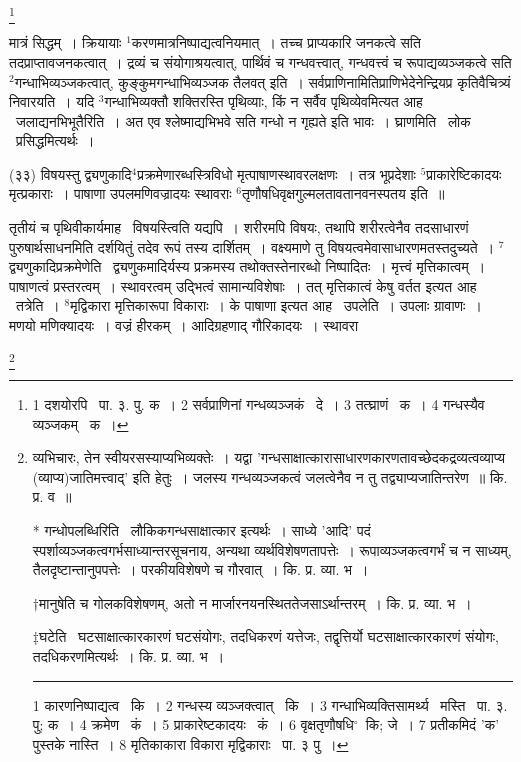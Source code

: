 \documentclass[11pt, openany]{book}
\newcommand\blfootnote[1]{%
 \begingroup
 \renewcommand\thefootnote{}\footnote{#1}%
 \addtocounter{footnote}{-1}%
 \endgroup
}
\begin{document}
\blfootnote{1 दशयोरपि  \textendash\ पा. ३. पु. क~। 2 सर्वप्राणिनां गन्धव्यञ्जकं  \textendash\ दे~। 3 तत्घ्राणं  \textendash\ क~। 4 गन्धस्यैव व्यञ्जकम्  \textendash\ क~।}

\newpage
\noindent
मात्रं सिद्धम्~। क्रियायाः ${}^1$करणमात्रनिष्पाद्यत्वनियमात्~। तच्च प्राप्यकारि जनकत्वे सति तदप्राप्तावजनकत्वात्~। द्रव्यं च संयोगाश्रयत्वात्, पार्थिवं च गन्धवत्त्वात्, गन्धवत्त्वं च रूपाद्यव्यञ्जकत्वे सति ${}^2$गन्धाभिव्यञ्जकत्वात्, कुङ्कुमगन्धाभिव्यञ्जक तैलवत् इति~। {\knu सर्वप्राणिना}मितिप्राणिभेदेनेन्द्रियप्र कृतिवैचित्र्यं निवारयति~। यदि ${}^3$गन्धाभिव्यक्तौ शक्तिरस्ति पृथिव्याः, किं न सर्वैव पृथिव्येवमित्यत आह \textendash\ {\knu जलाद्यनभिभूतैरिति}~। अत एव श्लेष्माद्यभिभवे सति गन्धो न गृह्यते इति भावः~। {\knu घ्राणमि}ति \textendash\ लोक \textendash\ प्रसिद्धमित्यर्थः~। 

\begin{sloppypar}
\hangindent=2cm {\knu (३३) विषयस्तु द्व्यणुकादि$^4$प्रक्रमेणारब्धस्त्रिविधो मृत्पाषाणस्थावरलक्षणः~। तत्र भूप्रदेशाः ${}^5$प्राकारेष्टिकादयः मृत्प्रकाराः~। पाषाणा उपलमणिवज्रादयः स्थावराः ${}^6$तृणौषधिवृक्षगुल्मलतावतानवनस्पतय इति~॥}
\end{sloppypar}

तृतीयं च पृथिवीकार्यमाह \textendash\ {\knu विषयस्त्वि}ति यद्यपि~। शरीरमपि विषयः, तथापि शरीरत्वेनैव तदसाधारणं पुरुषार्थसाधनमिति दर्शयितुं तदेव रूपं तस्य दार्शितम्~। वक्ष्यमाणे तु विषयत्वमेवासाधारणमतस्तदुच्यते~। ${}^7${\knu द्व्यणुकादिप्रक्रमेणेति} \textendash\ द्व्यणुकमादिर्यस्य प्रक्रमस्य तथोक्तस्तेनारब्धो निष्पादितः~। मृत्त्वं मृत्तिकात्वम्~। पाषाणत्वं प्रस्तरत्वम्~। स्थावरत्वम् उद्भित्वं सामान्यविशेषाः~। तत् मृत्तिकात्वं केषु वर्तत इत्यत आह \textendash\ {\knu तत्रे}ति~। ${}^8$मृद्विकारा मृत्तिकारूपा विकाराः~। के पाषाणा इत्यत आह \textendash\ {\knu उपले}ति~। उपलाः ग्रावाणः~। मणयो मणिक्यादयः~। वज्रं हीरकम्~। आदिग्रहणाद् गौरिकादयः~। {\knu स्थावरा}

\blfootnote{व्यभिचारः, तेन स्वीयरसस्याप्यभिव्यक्तेः~। यद्वा 'गन्धसाक्षात्कारासाधारणकारणतावच्छेदकद्रव्यत्वव्याप्य (व्याप्य)जातिमत्त्वाद्' इति हेतुः~। जलस्य गन्धव्यञ्जकत्वं जलत्वेनैव न तु तद्व्याप्यजातिन्तरेण~॥ कि. प्र. व~॥

* गन्धोपलब्धिरिति \textendash\ लौकिकगन्धसाक्षात्कार इत्यर्थः~। साध्ये 'आदि' पदं स्पर्शाव्यञ्जकत्वगर्भसाध्यान्तरसूचनाय, अन्यथा व्यर्थविशेषणतापत्तेः~। रूपाव्यञ्जकत्वगर्भं च न साध्यम्, तैलदृष्टान्तानुपपत्तेः~। परकीयविशेषणे च गौरवात्~। कि. प्र. व्या. भ~।

$\dagger$मानुषेति च गोलकविशेषणम्, अतो न मार्जारनयनस्थिततेजसाऽर्थान्तरम्~। कि. प्र. व्या. भ~।

$\ddagger$घटेति \textendash\ घटसाक्षात्कारकारणं घटसंयोगः, तदधिकरणं यत्तेजः, तद्वृत्तिर्यो घटसाक्षात्कारकारणं संयोगः, तदधिकरणमित्यर्थः~। कि. प्र. व्या. भ~।\\
\rule{0.4\linewidth}{0.5pt}

1 कारणनिष्पाद्यत्व  \textendash\ कि~। 2 गन्धस्य व्यञ्जक्त्वात्  \textendash\ कि~। 3 गन्धाभिव्यक्तिसामर्थ्य  \textendash\ मस्ति  \textendash\ पा. ३. पु; क~। 4 क्रमेण  \textendash\ कं~। 5 प्राकारेष्टकादयः  \textendash\ कं~। 6 वृक्षतृणौषधि$^\circ$\textendash\ कि; जे~। 7 प्रतीकमिदं 'क' पुस्तके नास्ति~। 8 मृतिकाकारा विकारा मृद्विकाराः  \textendash\ पा. ३ पु~।}
\end{document}
